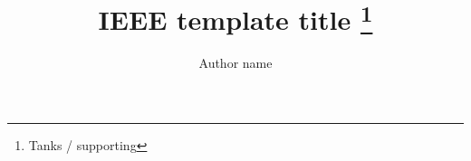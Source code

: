 \documentclass[10pt, conference, letterpaper]{IEEEtran}
\begin{document}
    
    \title{IEEE template title \thanks{Tanks / supporting}}
    \author{ Author name}
    \maketitle
    
    

    
\end{document}
